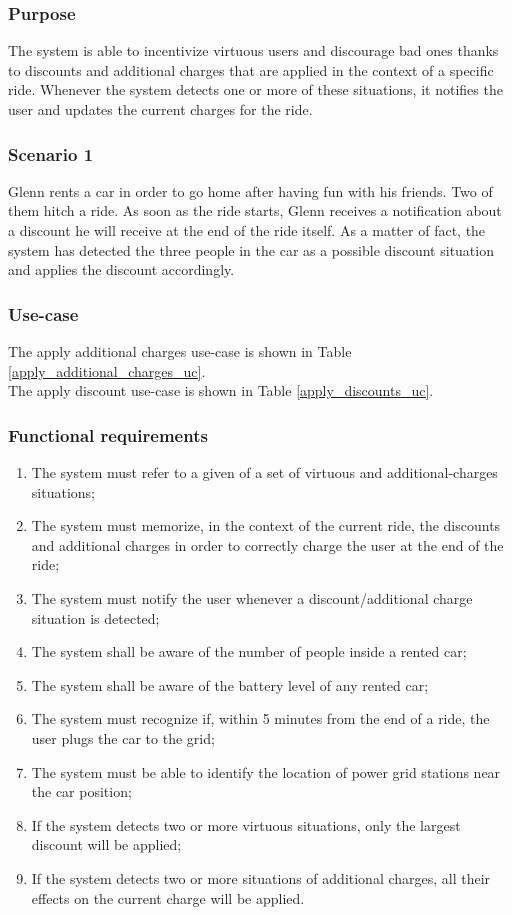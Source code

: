 \subsubsection{Purpose}
The system is able to incentivize virtuous users and discourage bad ones thanks to discounts and additional charges that are applied in the context of a specific ride. Whenever the system detects one or more of these situations, it notifies the user and updates the current charges for the ride.

\subsubsection{Scenario 1}
Glenn rents a car in order to go home after having fun with his friends. Two of them hitch a ride. As soon as the ride starts, Glenn receives a notification about a discount he will receive at the end of the ride itself. As a matter of fact, the system has detected the three people in the car as a possible discount situation and applies the discount accordingly.

\subsubsection{Use-case}
The apply additional charges use-case is shown in Table \ref{apply_additional_charges_uc}. \\
The apply discount use-case is shown in Table \ref{apply_discounts_uc}.

\subsubsection{Functional requirements}
\begin{enumerate}
\item The system must refer to a given of a set of virtuous and additional-charges situations;
\item The system must memorize, in the context of the current ride, the discounts and additional charges in order to correctly charge the user at the end of the ride;
\item The system must notify the user whenever a discount/additional charge situation is detected;
\item The system shall be aware of the number of people inside a rented car;
\item The system shall be aware of the battery level of any rented car;
\item The system must recognize if, within 5 minutes from the end of a ride, the user plugs the car to the grid;
\item The system must be able to identify the location of power grid stations near the car position;
\item If the system detects two or more virtuous situations, only the largest discount will be applied;
\item If the system detects two or more situations of additional charges, all their effects on the current charge will be applied.
\end{enumerate}

